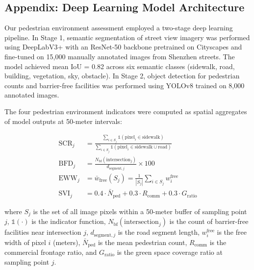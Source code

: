 \documentclass[10pt,conference,compsoc]{IEEEtran}
\begin{document}
\begin{table}[htbp]
\begin{center}
\section{Appendix: Deep Learning Model Architecture}
\label{appendix:dl_model}

Our pedestrian environment assessment employed a two-stage deep learning pipeline. In Stage 1, semantic segmentation of street view imagery was performed using DeepLabV3+ with an ResNet-50 backbone pretrained on Cityscapes and fine-tuned on 15{,}000 manually annotated images from Shenzhen streets. The model achieved mean IoU = 0.82 across six semantic classes (sidewalk, road, building, vegetation, sky, obstacle). In Stage 2, object detection for pedestrian counts and barrier-free facilities was performed using YOLOv8 \cite{jocher2022yolo} trained on 8{,}000 annotated images.

The four pedestrian environment indicators were computed as spatial aggregates of model outputs at 50-meter intervals:

\begin{align}
\text{SCR}_j &= \frac{\sum_{i \in S_j} \mathbb{1}(\text{pixel}_i \in \text{sidewalk})}{\sum_{i \in S_j} \mathbb{1}(\text{pixel}_i \in \text{sidewalk} \cup \text{road})} \label{eq:scr_def} \\
\text{BFD}_j &= \frac{N_{\text{bf}}(\text{intersection}_j)}{d_{\text{segment},j}} \times 100 \label{eq:bfd_def} \\
\text{EWW}_j &= \bar{w}_{\text{free}}(S_j) = \frac{1}{|S_j|} \sum_{i \in S_j} w_i^{\text{free}} \label{eq:eww_def} \\
\text{SVI}_j &= 0.4 \cdot \bar{N}_{\text{ped}} + 0.3 \cdot R_{\text{comm}} + 0.3 \cdot G_{\text{ratio}} \label{eq:svi_def}
\end{align}

where $S_j$ is the set of all image pixels within a 50-meter buffer of sampling point $j$, $\mathbb{1}(\cdot)$ is the indicator function, $N_{\text{bf}}(\text{intersection}_j)$ is the count of barrier-free facilities near intersection $j$, $d_{\text{segment},j}$ is the road segment length, $w_i^{\text{free}}$ is the free width of pixel $i$ (meters), $\bar{N}_{\text{ped}}$ is the mean pedestrian count, $R_{\text{comm}}$ is the commercial frontage ratio, and $G_{\text{ratio}}$ is the green space coverage ratio at sampling point $j$.


\end{center}
\end{table}
\end{document}
